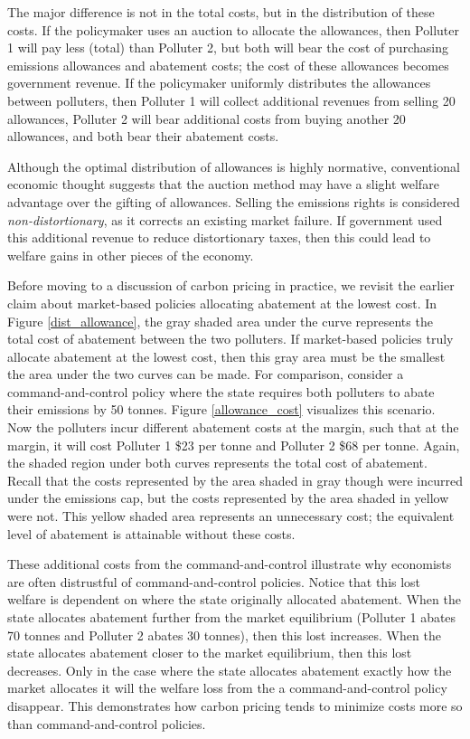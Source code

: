 The major difference is not in the total costs, but in the distribution of these costs. If the policymaker uses an auction to allocate the allowances, then Polluter 1 will pay less (total) than Polluter 2, but both will bear the cost of purchasing emissions allowances and abatement costs; the cost of these allowances becomes government revenue. If the policymaker uniformly distributes the allowances between polluters, then Polluter 1 will collect additional revenues from selling 20 allowances, Polluter 2 will bear additional costs from buying another 20 allowances, and both bear their abatement costs. 

Although the optimal distribution of allowances is highly normative, conventional economic thought suggests that the auction method may have a slight welfare advantage over the gifting of allowances. Selling the emissions rights is considered \emph{non-distortionary}, as it corrects an existing market failure. If government used this additional revenue to reduce distortionary taxes, then this could lead to welfare gains in other pieces of the economy.

Before moving to a discussion of carbon pricing in practice, we revisit the earlier claim about market-based policies allocating abatement at the lowest cost. In Figure \ref{dist_allowance}, the gray shaded area under the curve represents the total cost of abatement between the two polluters. If market-based policies truly allocate abatement at the lowest cost, then this gray area must be the smallest the area under the two curves can be made. For comparison, consider a command-and-control policy where the state requires both polluters to abate their emissions by 50 tonnes. Figure \ref{allowance_cost} visualizes this scenario. Now the polluters incur different abatement costs at the margin, such that at the margin, it will cost Polluter 1 \$23 per tonne and Polluter 2 \$68 per tonne. Again, the shaded region under both curves represents the total cost of abatement. Recall that the costs represented by the area shaded in gray though were incurred under the emissions cap, but the costs represented by the area shaded in yellow were not. This yellow shaded area represents an unnecessary cost; the equivalent level of abatement is attainable without these costs. 

These additional costs from the command-and-control illustrate why economists are often distrustful of command-and-control policies. Notice that this lost welfare is dependent on where the state originally allocated abatement. When the state allocates abatement further from the market equilibrium (Polluter 1 abates 70 tonnes and Polluter 2 abates 30 tonnes), then this lost increases. When the state allocates abatement closer to the market equilibrium, then this lost decreases. Only in the case where the state allocates abatement exactly how the market allocates it will the welfare loss from the a command-and-control policy disappear. This demonstrates how carbon pricing tends to minimize costs more so than command-and-control policies.


